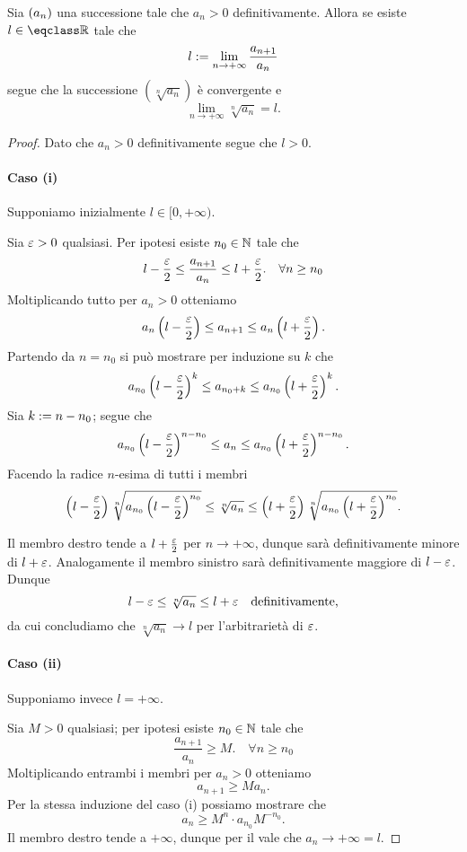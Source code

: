 \begin{proposition}
     \label{prop:rapp=>radice}
    Sia $\seqn*{a}$ una successione tale che $a_n > 0$ definitivamente. Allora se esiste $l \in \closure{\R}$ tale che \[
        l := \lim_{n \to +\infty} \frac{a_{n+1}}{a_n}    
    \] segue che la successione $(\sqrt[n]{a_n})$ è convergente e \[
        \lim_{n \to +\infty} \sqrt[n]{a_n} = l.
    \]
\end{proposition}
\begin{proof}
    Dato che $a_n > 0$ definitivamente segue che $l > 0$. 
    
    \paragraph{Caso (i)}Supponiamo inizialmente $l \in [0, +\infty)$.

    Sia $\varepsilon > 0$ qualsiasi. Per ipotesi esiste $n_0 \in \mathbb{N}$ tale che \[
        l - \frac{\varepsilon}{2} \leq \frac{a_{n+1}}{a_n} \leq l + \frac{\varepsilon}{2}.  \quad \forall n \geq n_0  
    \] Moltiplicando tutto per $a_n > 0$ otteniamo \[
        a_n\left(l - \frac{\varepsilon}{2}\right) \leq a_{n+1} \leq  a_n\left(l + \frac{\varepsilon}{2}\right).
    \] Partendo da $n = n_0$ si può mostrare per induzione su $k$ che \[
        a_{n_0}\left(l - \frac{\varepsilon}{2}\right)^k \leq a_{n_0 + k} \leq a_{n_0}\left(l + \frac{\varepsilon}{2}\right)^k.
    \] Sia $k := n - n_0$; segue che \[
        a_{n_0}\left(l - \frac{\varepsilon}{2}\right)^{n - n_0} \leq a_{n} \leq a_{n_0}\left(l + \frac{\varepsilon}{2}\right)^{n - n_0}.
    \] Facendo la radice $n$-esima di tutti i membri \[
        \left(l - \frac{\varepsilon}{2}\right)\sqrt[n]{a_{n_0}\left(l - \frac{\varepsilon}{2}\right)^{n_0}} \leq \sqrt[n]{a_n} \leq \left(l + \frac{\varepsilon}{2}\right)\sqrt[n]{a_{n_0}\left(l + \frac{\varepsilon}{2}\right)^{n_0}}.
    \]

    Il membro destro tende a $l + \frac{\varepsilon}{2}$ per $n \to +\infty$, dunque sarà definitivamente minore di $l + \varepsilon$. Analogamente il membro sinistro sarà definitivamente maggiore di $l - \varepsilon$. Dunque \[
        l - \varepsilon \leq \sqrt[n]{a_n} \leq l + \varepsilon \quad \text{definitivamente,}    
    \] da cui concludiamo che $\sqrt[n]{a_n} \to l$ per l'arbitrarietà di $\varepsilon$.

    \paragraph{Caso (ii)} Supponiamo invece $l = +\infty$.

    Sia $M > 0$ qualsiasi; per ipotesi esiste $n_0 \in \mathbb{N}$ tale che \[
        \frac{a_{n+1}}{a_n} \geq M.  \quad \forall n \geq n_0  
    \] Moltiplicando entrambi i membri per $a_n > 0$ otteniamo \[
        a_{n+1} \geq Ma_n. 
    \] Per la stessa induzione del caso (i) possiamo mostrare che \[
        a_n \geq  M^n \cdot a_{n_0}M^{-n_0}.
    \] Il membro destro tende a $+\infty$, dunque per il  vale che $a_n \to +\infty = l$.
\end{proof}